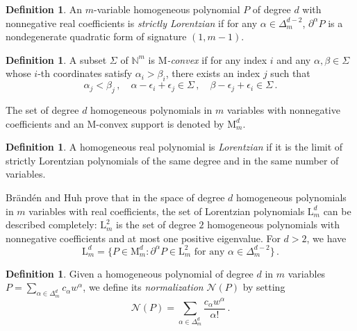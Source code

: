 \documentclass[12pt,reqno]{amsart}
\theoremstyle{definition}
\newtheorem{definition}[theorem]{Definition}
\def\normal{\mathcal{N}}
\begin{document}
\begin{definition}\label{defn:Lorentzian}
An $m$-variable homogeneous polynomial $P$ of degree $d$ with nonnegative real coefficients is \emph{strictly Lorentzian} if for any $\alpha \in \Delta_{m}^{d-2}$, $\partial^{\alpha} P$ is a nondegenerate quadratic form of signature $(1,m-1)$.
\par
\end{definition}

\begin{definition}
    A subset $\Sigma$ of $\mathbb{N}^{m}$ is \emph{$\mathrm{M}$-convex} if for any index $i$ and any $\alpha, \beta \in \Sigma$ whose $i$-th coordinates satisfy $\alpha_i > \beta_i$, there exists an index $j$ such that
    $$
    \alpha_j < \beta_j \, , \quad \alpha - \epsilon_i + \epsilon_j \in \Sigma \, , \quad \beta - \epsilon_j + \epsilon_i \in \Sigma \, .
    $$
\end{definition}

The set of degree $d$ homogeneous polynomials in $m$ variables with nonnegative coefficients and an $\mathrm{M}$-convex support is denoted by $\mathrm{M}_m^d$.

\begin{definition}
 A homogeneous real polynomial is \emph{Lorentzian} if it is the limit of strictly Lorentzian polynomials of the same degree and in the same number of variables.   
\end{definition}

Br{\"a}nd{\'e}n and Huh \cite{branden2020lorentzian} prove that in the space of degree $d$ homogeneous polynomials in $m$ variables with real coefficients, the set of Lorentzian polynomials $\mathrm{L}_m^d$ can be described completely: $\mathrm{L}_m^2$ is the set of degree $2$ homogeneous polynomials with nonnegative coefficients and at most one positive eigenvalue. For $d > 2$, we have
$$
\mathrm{L}_m^d = \{ P \in \mathrm{M}_m^d : \partial^{\alpha} P \in \mathrm{L}_m^2 \text{ for any $\alpha \in \Delta_{m}^{d-2}$}  \} \,.
$$



\begin{definition}\label{defn:Normalization}
Given a homogeneous polynomial of degree $d$ in $m$ variables $P=\sum\limits_{\alpha \in \Delta_{m}^{d}} c_{\alpha}w^{\alpha}$, we define its \emph{normalization} $\normal(P)$ by setting $$\normal(P) = \sum\limits_{\alpha \in \Delta_{m}^{d}} \frac{c_{\alpha}w^{\alpha}}{\alpha!}\,.$$
\end{definition}
\end{document}
